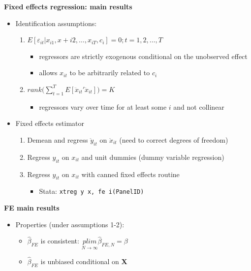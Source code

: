 \documentclass[notes=show]{beamer}
\begin{document}
\begin{frame}[plain]
	\begin{center}
	\textbf{Fixed effects regression: main results}
	\end{center}
	
	\begin{itemize}
	\item Identification assumptions:	
		\begin{enumerate}
		\item $E[\varepsilon_{it} | x_{i1}, x+{i2}, \dots, x_{iT}, c_i]=0; t=1,2,\dots,T$
			\begin{itemize}
			\item regressors are strictly exogenous conditional on the unobserved effect
			\item allows $x_{it}$ to be arbitrarily related to $c_i$
			\end{itemize}
		\item $rank\bigg( \sum_{t=1}^T E[\ddot{x}_{it}'\ddot{x}_{it}]\bigg) = K$
			\begin{itemize}
			\item regressors vary over time for at least some $i$ and not collinear
			\end{itemize}
		\end{enumerate}
	\item Fixed effects estimator
		\begin{enumerate}
		\item Demean and regress $\ddot{y}_{it}$ on $\ddot{x}_{it}$ (need to correct degrees of freedom)
		\item Regress $y_{it}$ on $x_{it}$ and unit dummies (dummy variable regression)
		\item Regress $y_{it}$ on $x_{it}$ with canned fixed effects routine
			\begin{itemize}
			\item Stata: \texttt{xtreg y x, fe i(PanelID)}
			\end{itemize}
		\end{enumerate}
	\end{itemize}
\end{frame}


\begin{frame}[plain]
\begin{center}
\textbf{FE main results}
\end{center}

\begin{itemize}
	\item Properties (under assumptions 1-2):
		\begin{itemize}
		\item $\widehat{\beta}_{FE}$ is consistent: $\underset{N\rightarrow \infty}{plim} \widehat{\beta}_{FE,N}=\beta$
		\item $\widehat{\beta}_{FE}$ is unbiased conditional on \textbf{X}
		\end{itemize}
\end{itemize}

\end{frame}
\end{document}
